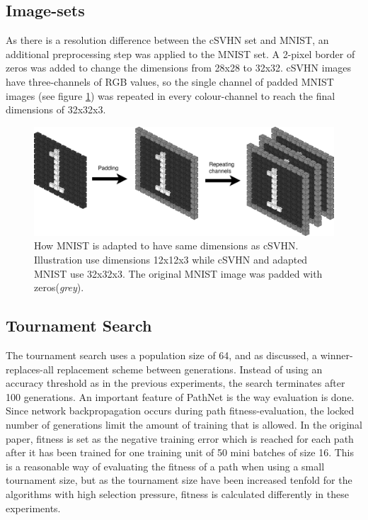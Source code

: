 \subsection{Image-sets}
As there is a resolution difference between the cSVHN set and MNIST, an additional preprocessing step was applied to the MNIST set. A 2-pixel border of zeros was added to change the dimensions from 28x28 to 32x32. cSVHN images have three-channels of RGB values, so the single channel of padded MNIST images (see figure \ref{fig:MNISTpadding}) was repeated in every colour-channel to reach the final dimensions of 32x32x3.  

\begin{figure}[ht]
    \includegraphics[width=\textwidth]{Chapters/4.Experiments/exp2/figures/MNISTpadding+repeating.png}
    \caption[MNIST modifications]{How MNIST is adapted to have same dimensions as cSVHN. Illustration use dimensions 12x12x3 while cSVHN and adapted MNIST use 32x32x3. The original MNIST image was padded with zeros(\textit{grey}).}
    \label{fig:MNISTpadding}
\end{figure}

\subsection{Tournament Search}
\label{exp2:implementation.search}
The tournament search uses a population size of 64, and as discussed, a winner-replaces-all replacement scheme between generations. Instead of using an accuracy threshold as in the previous experiments, the search terminates after 100 generations. An important feature of PathNet is the way evaluation is done. Since network backpropagation occurs during path fitness-evaluation, the locked number of generations limit the amount of training that is allowed. In the original paper, fitness is set as the negative training error which is reached for each path after it has been trained for one training unit of 50 mini batches of size 16. This is a reasonable way of evaluating the fitness of a path when using a small tournament size, but as the tournament size have been increased tenfold for the algorithms with high selection pressure, fitness is calculated differently in these experiments. 

